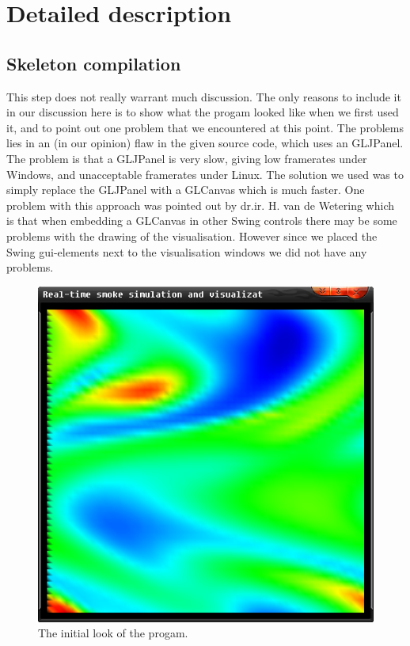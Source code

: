 \documentclass[a4paper,11pt,twoside]{report}
\begin{document}
\chapter{Detailed description}\label{detaileddescription}
	\section{Skeleton compilation}
		This step does not really warrant much discussion. The only reasons to include it in our discussion here is to show what the progam looked like when we first used it, and to point out one problem that we encountered at this point. The problems lies in an (in our opinion) flaw in the given source code, which uses an GLJPanel. The problem is that a GLJPanel is very slow, giving low framerates under Windows, and unacceptable framerates  under Linux. The solution we used was to simply replace the GLJPanel with a GLCanvas which is much faster. One problem with this approach was pointed out by dr.ir. H. van de Wetering which is that when embedding a GLCanvas in other Swing controls there may be some problems with the drawing of the visualisation. However since we placed the Swing gui-elements next to the visualisation windows we did not have any problems.
		\begin{figure}[h]
		\centering
		\includegraphics[scale=\imagescalefactor]{images/step1.png}
		\caption{The initial look of the progam.}\label{fig:step1}
		\end{figure}
		\clearpage
\end{document}
